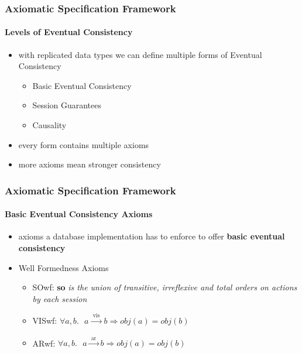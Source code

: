 \documentclass[11pt]{beamer}
\begin{document}
\begin{frame}
\frametitle{Axiomatic Specification Framework}
\framesubtitle{Levels of Eventual Consistency}
\begin{itemize}
\item with replicated data types we can define multiple forms of Eventual Consistency
\begin{itemize}
\item Basic Eventual Consistency
\item Session Guarantees
\item Causality
\end{itemize}
\item every form contains multiple axioms
\item more axioms mean stronger consistency
\end{itemize}
\end{frame}

\begin{frame}
\frametitle{Axiomatic Specification Framework}
\framesubtitle{Basic Eventual Consistency Axioms}
\begin{itemize}
\item axioms a database implementation has to enforce to offer \textbf{basic eventual consistency} 
\item Well Formedness Axioms
\begin{itemize}
\item SOwf: \textbf{so} \textit{is the union of transitive, irreflexive and total orders
on actions by each session}
\item VISwf: \(\forall a,b. \text{ } a \xrightarrow[]{\text{ vis }}b \Rightarrow obj(a) = obj(b) \)
\item ARwf: \(\forall a,b. \text{ } a \xrightarrow[]{\text{ ar }} b \Rightarrow obj(a) = obj(b) \)
\end{itemize}
\end{itemize}
\end{frame}
\end{document}

